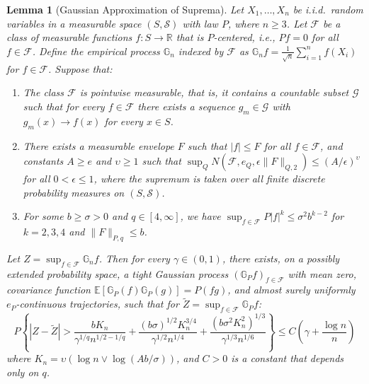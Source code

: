 \documentclass[10pt]{article}
\newtheorem{lem}{Lemma}
\newcommand{\E}{\mathbb{E}}
\begin{document}
\begin{lem}[Gaussian Approximation of Suprema]\label{sa-lem: suprema coupling lemma}
    Let $X_1, \dots, X_n$ be i.i.d.\ random variables in a measurable space $(S, \mathcal{S})$ with law $P$, where $n \ge 3$. Let $\mathcal{F}$ be a class of measurable functions $f: S \to \mathbb{R}$ that is $P$-centered, i.e., $Pf = 0$ for all $f \in \mathcal{F}$. Define the empirical process $\mathbb{G}_n$ indexed by $\mathcal{F}$ as $\mathbb{G}_n f = \frac{1}{\sqrt{n}} \sum_{i=1}^n f(X_i)$ for $f \in \mathcal{F}$. Suppose that:
    \begin{enumerate}
        \item The class $\mathcal{F}$ is pointwise measurable, that is, it contains a countable subset $\mathcal{G}$ such that for every $f \in \mathcal{F}$ there exists a sequence $g_m \in \mathcal{G}$ with $g_m(x) \to f(x)$ for every $x \in S$.
        \item There exists a measurable envelope $F$ such that $|f| \le F$ for all $f \in \mathcal{F}$, and constants $A \ge e$ and $\upsilon \ge 1$ such that $\sup_Q N(\mathcal{F}, e_Q, \epsilon \|F\|_{Q,2}) \le (A/\epsilon)^{\upsilon}$ for all $0 < \epsilon \le 1$, where the supremum is taken over all finite discrete probability measures on $(S, \mathcal{S})$.
        \item For some $b \ge \sigma > 0$ and $q \in [4, \infty]$, we have $\sup_{f \in \mathcal{F}} P|f|^k \le \sigma^2 b^{k-2}$ for $k = 2, 3, 4$ and $\|F\|_{P,q} \le b$.
    \end{enumerate}
    Let $Z = \sup_{f \in \mathcal{F}} \mathbb{G}_n f$. Then for every $\gamma \in (0, 1)$, there exists, on a possibly extended probability space, a tight Gaussian process $(\mathbb{G}_P f)_{f \in \mathcal{F}}$ with mean zero, covariance function $\E[\mathbb{G}_P(f)\mathbb{G}_P(g)] = P(fg)$, and almost surely uniformly $e_P$-continuous trajectories, such that for $\tilde{Z} = \sup_{f \in \mathcal{F}} \mathbb{G}_P f$:
    $$ P\left\{ |Z - \tilde{Z}| > \frac{b K_n}{\gamma^{1/q} n^{1/2-1/q}} + \frac{(b \sigma)^{1/2} K_n^{3/4}}{\gamma^{1/2} n^{1/4}} + \frac{(b \sigma^2 K_n^2)^{1/3}}{\gamma^{1/3} n^{1/6}} \right\} \le C \left( \gamma + \frac{\log n}{n} \right) $$
    where $K_n = \upsilon(\log n \vee \log(A b/\sigma))$, and $C > 0$ is a constant that depends only on $q$.
\end{lem}
\end{document}
